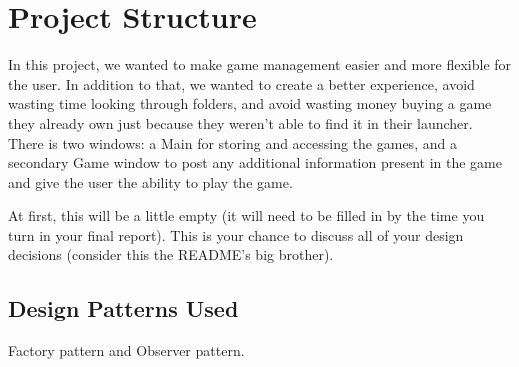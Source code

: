 \documentclass[10pt,conference,onecolumn,compsoc]{IEEEtran}
\begin{document}
\section{Project Structure}
In this project, we wanted to make game management easier and more flexible for the user. In addition to that, we wanted to create a better experience, avoid wasting time looking through folders, and avoid wasting money buying a game they already own just because they weren't able to find it in their launcher. There is two windows: a Main for storing and accessing the games, and a secondary Game window to post any additional information present in the game and give the user the ability to play the game.

At first, this will be a little empty (it will need to be filled in by the time you turn in your final report).  This is your chance to discuss all of your design decisions (consider this the README's big brother).
%
%
%
%
\subsection{Design Patterns Used}
Factory pattern and Observer pattern.
%
%
\end{document}
